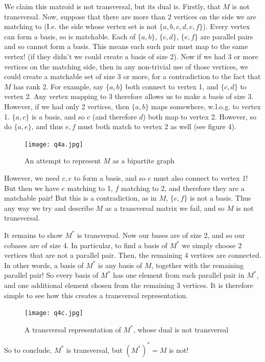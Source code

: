 \documentclass{article}
\begin{document}
We claim this matroid is not transversal, but its dual is.
Firstly, that $M$ is not transversal. Now, suppose that there are more than 2 vertices on the side we are matching to
(I.e. the side whose vertex set is not $\{a, b, c, d, e, f\}$). Every vertex can form a basis, so is matchable.
Each of $\{a, b\}$, $\{c, d\}$, $\{e, f\}$ are parallel pairs and so cannot form a basis. This means each such pair must map to the same vertex! (if 
they didn't we could create a basis of size 2). Now if we had 3 or more vertices on the matching side, then in any non-trivial use of those vertices,
we could create a matchable set of size 3 or more, for a contradiction to the fact that $M$ has rank 2.
For example, say $\{a, b\}$ both connect to vertex 1, and $\{c, d\}$ to vertex 2. Any vertex mapping to 3 therefore allows us to make a basis of size 3.
However, if we had only 2 vertices, then $\{a, b\}$ maps somewhere, w.l.o.g. to vertex 1. $\{a, c\}$ is a basis, and so $c$ (and therefore $d$) both map to vertex 2.
However, so do $\{a, e\}$, and thus $e, f$ must both match to vertex 2 as well (see figure 4).
\begin{figure}
    \label{attempt}
    \centering
    \texttt{[image: q4a.jpg]}
    \caption{An attempt to represent $M$ as a bipartite graph}
\end{figure} 

However, we need $c, e$ to form a basis, and so $e$ must also connect to vertex 1!
But then we have $e$ matching to 1, $f$ matching to 2, and therefore they are a matchable pair! But this is a contradiction, as in $M$, $\{e, f\}$ is not a basis.
Thus any way we try and describe $M$ as a transversal matrix we fail, and so $M$ is not transversal.

It remains to show $M^*$ is transversal.
Now our bases are of size 2, and so our cobases are of size 4. In particular, 
to find a basis of $M^*$ we simply choose 2 vertices that are not a parallel pair. Then, the remaining 4 vertices are connected.
In other words, a basis of $M^*$ is any basis of $M$, together with the remaining parallel pair!
So every basis of $M^*$ has one element from each parallel pair in $M^*$, and one additional element chosen from the remaining 3 vertices.
It is therefore simple to see how this creates a transversal representation.
\begin{figure}
    \label{representation}
    \centering
    \texttt{[image: q4c.jpg]}
    \caption{A transversal representation of $M^*$, whose dual is not transversal}
\end{figure}
So to conclude, $M^*$ is transversal, but $(M^*)^*=M$ is not!
\end{document}
